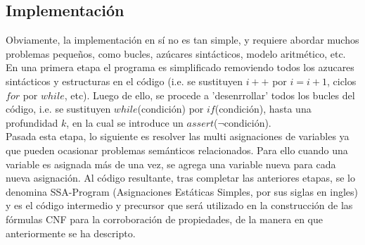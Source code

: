 \documentclass{llncs}
\begin{document}
    \subsection{Implementación}
        Obviamente, la implementación en sí no es tan simple, y requiere abordar
        muchos problemas pequeños, como bucles, azúcares sintácticos, modelo
        aritmético, etc. 
        \\ \indent En una primera etapa el programa es simplificado removiendo
        todos los azucares sintácticos y estructuras en el código (i.e. se
        sustituyen $i++$ por $i=i+1$, ciclos $for$ por $while$, etc).
        Luego de ello, se procede a 'desenrrollar' todos los bucles del código,
        i.e. se sustituyen $while$(condición) por $if$(condición), hasta una
        profundidad $k$, en la cual se introduce un $assert$($\neg$condición).
        \\ \indent Pasada esta etapa, lo siguiente es resolver las multi
        asignaciones de variables ya que pueden ocasionar problemas
        semánticos relacionados. Para ello cuando una variable es asignada más
        de una vez, se agrega una variable nueva para cada nueva asignación.
        Al código resultante, tras completar las anteriores etapas, se lo
        denomina SSA-Program (Asignaciones Estáticas Simples, por sus siglas en
        ingles) y es el código intermedio y precursor que será utilizado
        en la construcción de las fórmulas CNF para la corroboración de
        propiedades, de la manera en que anteriormente se ha descripto.
\end{document}
